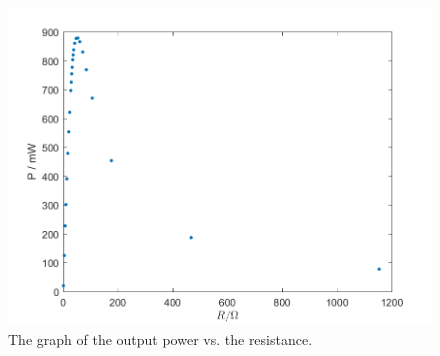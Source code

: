 \begin{figure}[H]
\centering
\includegraphics[scale=0.6]{PR4.png}
\caption{The graph of the output power vs. the resistance.}
\label{PR-4}
\end{figure}
$$$$

